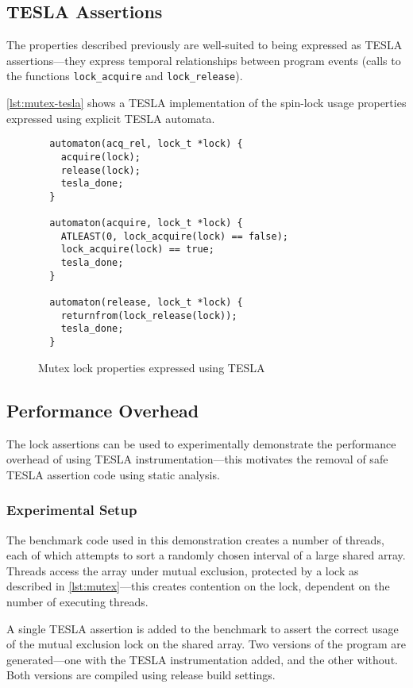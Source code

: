 \subsection{TESLA Assertions}

The properties described previously are well-suited to being expressed as TESLA
assertions---they express temporal relationships between program events (calls
to the functions \texttt{lock_acquire} and \texttt{lock_release}).

\autoref{lst:mutex-tesla} shows a TESLA implementation of the spin-lock
usage properties expressed using explicit TESLA automata.
\begin{figure}
  \begin{verbatim}
  automaton(acq_rel, lock_t *lock) {
    acquire(lock);
    release(lock);
    tesla_done;
  }

  automaton(acquire, lock_t *lock) {
    ATLEAST(0, lock_acquire(lock) == false);
    lock_acquire(lock) == true;
    tesla_done;
  }

  automaton(release, lock_t *lock) {
    returnfrom(lock_release(lock));
    tesla_done;
  }
  \end{verbatim}
  \caption{Mutex lock properties expressed using TESLA}
  \label{lst:mutex-tesla}
\end{figure}

\subsection{Performance Overhead}

The lock assertions can be used to experimentally demonstrate the
performance overhead of using TESLA instrumentation---this motivates the
removal of safe TESLA assertion code using static analysis.

\subsubsection{Experimental Setup}

The benchmark code used in this demonstration creates a number of
threads, each of which attempts to sort a randomly chosen interval of a
large shared array. Threads access the array under mutual exclusion,
protected by a lock as described in \autoref{lst:mutex}---this creates
contention on the lock, dependent on the number of executing threads.

A single TESLA assertion is added to the benchmark to assert the correct
usage of the mutual exclusion lock on the shared array. Two versions of
the program are generated---one with the TESLA instrumentation added,
and the other without. Both versions are compiled using release build
settings.


